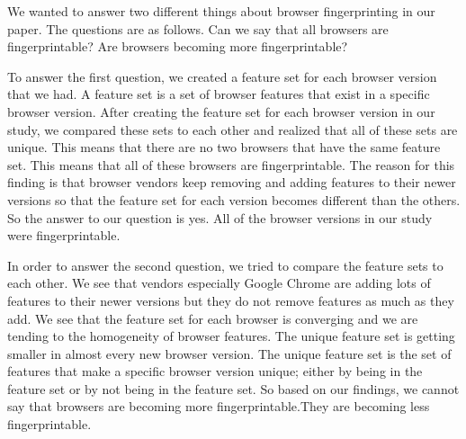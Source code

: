 We wanted to answer two different things about browser fingerprinting in our paper. The questions are as follows. Can we say that all browsers are fingerprintable? Are browsers becoming more fingerprintable?

To answer the first question, we created a feature set for each browser version that we had. A feature set is a set of browser features that exist in a specific browser version. After creating the feature set for each browser version in our study, we compared these sets to each other and realized that all of these sets are unique. This means that there are no two browsers that have the same feature set. This means that all of these browsers are fingerprintable. The reason for this finding is that browser vendors keep removing and adding features to their newer versions so that the feature set for each version becomes different than the others. So the answer to our question is yes. All of the browser versions in our study were fingerprintable.


In order to answer the second question, we tried to compare the feature sets to each other. We see that vendors especially Google Chrome are adding lots of features to their newer versions but they do not remove features as much as they add. We see that the feature set for each browser is converging and we are tending to the homogeneity of browser features. The unique feature set is getting smaller in almost every new browser version. The unique feature set is the set of features that make a specific browser version unique; either by being in the feature set or by not being in the feature set. 
So based on our findings, we cannot say that browsers are becoming more fingerprintable.They are becoming less fingerprintable.


